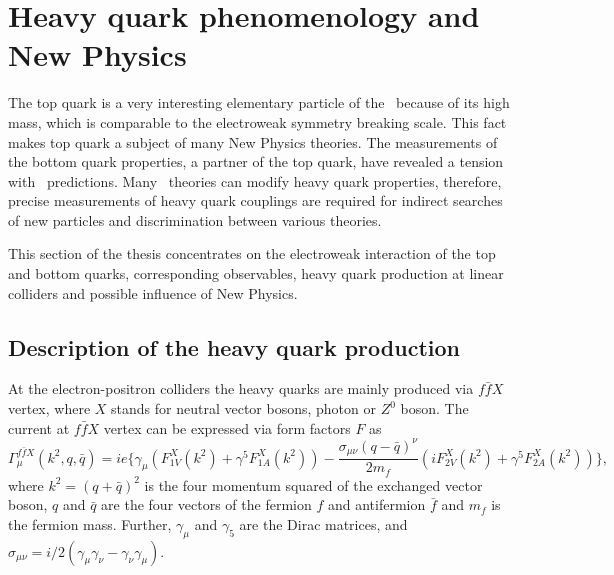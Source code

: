 \section{Heavy quark phenomenology and New Physics}
The top quark is a very interesting elementary particle of the \sm\ because of its high mass, which is comparable to the electroweak symmetry breaking scale. 
This fact makes top quark a subject of many New Physics theories. 
The measurements of the bottom quark properties, a partner of the top quark, have revealed a tension with \sm\ predictions. 
Many \bsm\ theories can modify heavy quark properties, therefore, precise measurements of heavy quark couplings are required for indirect searches of new particles and discrimination between various theories. 

This section of the thesis concentrates on the electroweak interaction of the top and bottom quarks, corresponding observables, heavy quark production at linear colliders and possible influence of New Physics.



\subsection{Description of the heavy quark production}

At the electron-positron colliders the heavy quarks are mainly produced via $f\bar{f}X$ vertex, where $X$ stands for neutral vector bosons, photon or $Z^0$ boson.  The current at $f\bar{f}X$ vertex can be expressed via form factors $F$ as 
\begin{equation}
\Gamma^{f\bar{f}X}_\mu (k^2,q,\bar{q}) = ie\{ \gamma_\mu (F^X_{1V}(k^2) + \gamma^5 F^X_{1A}(k^2)) - \frac{\sigma_{\mu\nu}(q-\bar{q})^\nu}{2m_f}(iF^X_{2V}(k^2) + \gamma^5 F^X_{2A}(k^2)) \},
\end{equation}
where $k^2= (q+\bar{q})^2$ is the four momentum squared of the exchanged vector boson, $q$ and $\bar{q}$ are the four vectors of the fermion $f$ and antifermion $\bar{f}$ and $m_f$ is the fermion mass. Further, $\gamma_\mu$ and $\gamma_5$ are the Dirac matrices, and $\sigma_{\mu\nu} = i/2(\gamma_\mu\gamma_\nu - \gamma_\nu\gamma_\mu)$.

